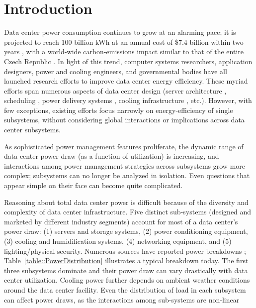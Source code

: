 \section{Introduction}

Data center power consumption continues to grow at an alarming pace; it is projected to reach 100 billion kWh at an annual cost of \$7.4 billion within two years \cite{EPA07}, with a world-wide carbon-emissions impact similar to that of the entire Czech Republic \cite{Mankoff08}. In light of this trend, computer systems researchers, application designers, power and cooling engineers, and governmental bodies have all launched research efforts to improve data center energy efficiency.  These myriad efforts span numerous aspects of data center design (server architecture \cite{Lefurgy03,Meisner09}, scheduling \cite{Moore06, Parolini08},  power delivery systems \cite{Fan07}, cooling infrastructure \cite{Patel02}, etc.).  However, with few exceptions, existing efforts focus narrowly on energy-efficiency of single subsystems, without considering global interactions or implications across data center subsystems. 

As sophisticated power management features proliferate, the dynamic range of data center power draw (as a function of utilization) is increasing, and interactions among power management strategies across subsystems grow more complex; subsystems can no longer be analyzed in isolation.   Even questions that appear simple on their face can become quite complicated.

Reasoning about total data center power is difficult because of the diversity and complexity of data center infrastructure.  Five distinct sub-systems (designed and marketed by different industry segments) account for most of a data center's power draw:  (1) servers and storage systems, (2) power conditioning equipment, (3) cooling and humidification systems, (4) networking equipment, and (5) lighting/physical security.  Numerous sources have reported power breakdowns \cite{EPA07,Meisner09}; Table~\ref{table::PowerDistribution} illustrates a typical breakdown today.   The first three subsystems dominate and their power draw can vary drastically with data center utilization. Cooling power further depends on ambient weather conditions around the data center facility. Even the distribution of load in each subsystem can affect power draws, as the interactions among sub-systems are non-linear


